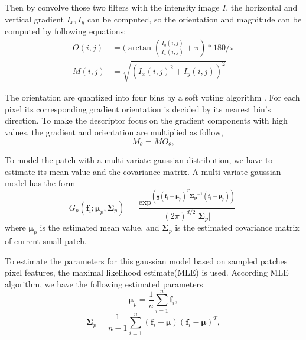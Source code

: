 Then by convolve those two filters with the intensity image $I$, the horizontal and vertical gradient $I_x, I_y$ can be computed, so the orientation and magnitude can be computed by following equations:
\begin{equation}
\begin{aligned}
O(i,j) &= (\arctan(\frac{I_y(i,j)}{I_x(i,j)}+\pi)*180 /{\pi} \\
M(i,j) &= \sqrt{(I_x(i,j)^2 + I_y(i,j))^2}
\end{aligned}
\end{equation}

The orientation are quantized into four bins by a soft voting algorithm \cite{AutoRela}. For each pixel its corresponding gradient orientation is decided by its nearest bin's direction. To make the descriptor focus on the gradient components with high values, the gradient and orientation are multiplied as follow,
\begin{equation}
M_{\theta} = MO_{\theta},
\end{equation}


To model the patch with a multi-variate gaussian distribution, we have to estimate its mean value and the covariance matrix. A multi-variate gaussian model has the form
\begin{equation}
G_p(\bm{f}_i;\bm{\mu}_p,\bm{\Sigma}_p) = \frac{\exp^{(\frac{1}{2}(\bm{f}_i-\bm{\mu}_p)^T\bm{\Sigma_p}^{-1}(\bm{f}_i-\bm{\mu}_p))}}{(2\pi)^{d/2}|{\bm{\Sigma}_p|}} 
\end{equation}
where $\bm {\mu}_p$ is the estimated mean value, and $\bm {\Sigma}_p $ is the estimated covariance matrix of current small patch. 

To estimate the parameters for this gaussian model based on sampled patches pixel features, the maximal likelihood estimate(MLE) is used. According MLE algorithm, we have the following estimated parameters
\begin{equation}
\bm{\mu}_p = \frac{1}{n}\sum_{i = 1}^n \bm{f}_i,
\end{equation}
\begin{equation}
\bm{\Sigma}_p = \frac{1}{n-1} \sum_{i = 1}^n(\bm{f}_i-\bm{\mu})(\bm{f}_i-\bm{\mu})^T,
\end{equation}

